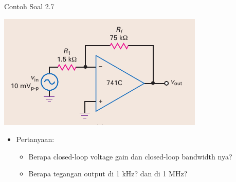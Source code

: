 \begin{frame}{Contoh Soal 2.7}
	\begin{multicols}{2}
		\begin{center}
			\includegraphics[width=0.7\linewidth]{gambar/fig-16.16a}
		\end{center}
		\columnbreak
		\begin{itemize}
			\item Pertanyaan:
			\begin{itemize}
				\item Berapa closed-loop voltage gain dan closed-loop bandwidth nya?
				\item Berapa tegangan output di 1 kHz? dan di 1 MHz?
			\end{itemize}
		\end{itemize}
	\end{multicols}
\end{frame}

